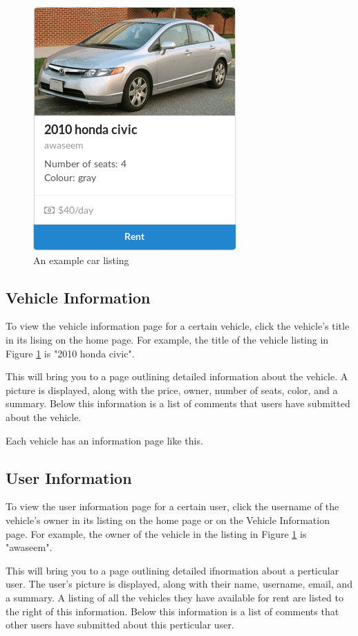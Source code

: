 \documentclass{article}
\begin{document}
\begin{figure}[ht!]
    \centering
    \includegraphics[keepaspectratio, scale=0.5]{carcard}
    \caption{An example car listing}
    \label{fig:carcard}
\end{figure}

\subsection{Vehicle Information}
To view the vehicle information page for a certain vehicle, click the vehicle's title in its lising on the home page. For example, the title of the vehicle listing in Figure \ref{fig:carcard} is "2010 honda civic".

This will bring you to a page outlining detailed information about the vehicle. A picture is displayed, along with the price, owner, number of seats, color, and a summary. Below this information is a list of comments that users have submitted about the vehicle.

Each vehicle has an information page like this.

\subsection{User Information}
To view the user information page for a certain user, click the username of the vehicle's owner in its listing on the home page or on the Vehicle Information page. For example, the owner of the vehicle in the listing in Figure \ref{fig:carcard} is "awaseem".

This will bring you to a page outlining detailed ifnormation about a perticular user. The user's picture is displayed, along with their name, username, email, and a summary. A listing of all the vehicles they have available for rent are listed to the right of this information. Below this information is a list of comments that other users have submitted about this perticular user.
\end{document}
